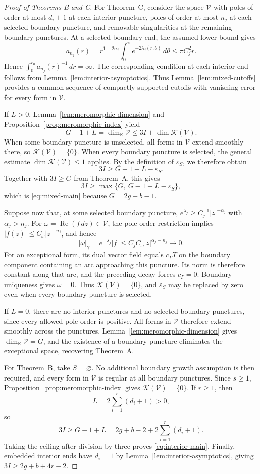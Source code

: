 \documentclass[11pt]{amsart}
\numberwithin{equation}{section}
\theoremstyle{definition}
\theoremstyle{remark}
\newcommand{\R}{\mathbb R}
\newcommand{\KK}{\mathcal K}
\DeclareMathOperator{\Rea}{Re}
\begin{document}
\begin{proof}[Proof of Theorems B and C]
For Theorem~C, consider the space $\mathcal V$ with poles of order
at most $d_i+1$ at each interior puncture, poles of order at most
$n_j$ at each selected boundary puncture, and removable
singularities at the remaining boundary punctures.
At a selected boundary end, the assumed lower bound gives
\[
a_{n_j}(r)
=r^{1-2n_j}\int_0^\pi e^{-2\lambda_j(r,\theta)}\,d\theta
\le \pi C_j^2r.
\]
Hence $\int_0^{r_0}a_{n_j}(r)^{-1}\,dr=\infty$.
The corresponding condition at each interior end follows from
Lemma~\ref{lem:interior-asymptotics}.
Thus Lemma~\ref{lem:mixed-cutoffs} provides a common sequence
of compactly supported cutoffs with vanishing error for
every form in $\mathcal V$.

If $L>0$, Lemma~\ref{lem:meromorphic-dimension} and
Proposition~\ref{prop:meromorphic-index} yield
\[
G-1+L=\dim_{\R}\mathcal V
\le 3I+\dim\KK(\mathcal V).
\]
When some boundary puncture is unselected, all forms in $\mathcal V$
extend smoothly there, so $\KK(\mathcal V)=\{0\}$.
When every boundary puncture is selected, the general estimate
$\dim\KK(\mathcal V)\le1$ applies. By the definition of
$\varepsilon_S$, we therefore obtain
\[
3I\ge G-1+L-\varepsilon_S.
\]
Together with $3I\ge G$ from Theorem~A, this gives
\[
3I\ge\max\{G,\ G-1+L-\varepsilon_S\},
\]
which is \eqref{eq:mixed-main} because $G=2g+b-1$.

Suppose now that, at some selected boundary puncture,
$e^{\lambda_j}\ge C_j^{-1}|z|^{-\alpha_j}$ with $\alpha_j>n_j$.
For $\omega=\Rea(f\,dz)\in\mathcal V$, the pole-order restriction
implies $|f(z)|\le C_\omega|z|^{-n_j}$, and hence
\[
|\omega|_\gamma=e^{-\lambda_j}|f|
\le C_jC_\omega|z|^{\alpha_j-n_j}\longrightarrow0.
\]
For an exceptional form, its dual vector field equals
$c_\Gamma T$ on the boundary component containing an arc
approaching this puncture. Its norm is therefore constant
along that arc, and the preceding decay forces $c_\Gamma=0$.
Boundary uniqueness gives $\omega=0$. Thus
$\KK(\mathcal V)=\{0\}$, and $\varepsilon_S$ may be replaced
by zero even when every boundary puncture is selected.

If $L=0$, there are no interior punctures and no selected
boundary punctures, since every allowed pole order is positive.
All forms in $\mathcal V$ therefore extend smoothly across
the punctures. Lemma~\ref{lem:meromorphic-dimension} gives
$\dim_{\R}\mathcal V=G$, and the existence of a boundary puncture
eliminates the exceptional space, recovering Theorem~A.

For Theorem~B, take $S=\varnothing$. No additional boundary
growth assumption is then required, and every form in
$\mathcal V$ is regular at all boundary punctures.
Since $s\ge1$, Proposition~\ref{prop:meromorphic-index} gives
$\KK(\mathcal V)=\{0\}$. If $r\ge1$, then
\[
L=2\sum_{i=1}^r(d_i+1)>0,
\]
so
\[
3I\ge G-1+L
=2g+b-2+2\sum_{i=1}^r(d_i+1).
\]
Taking the ceiling after division by three proves
\eqref{eq:interior-main}. Finally, embedded interior ends
have $d_i=1$ by Lemma~\ref{lem:interior-asymptotics}, giving
$3I\ge2g+b+4r-2$.
\end{proof}
\end{document}
